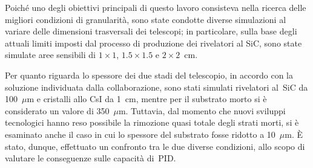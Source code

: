 Poiché uno degli obiettivi principali di questo lavoro consisteva nella ricerca delle migliori condizioni di granularità, sono state condotte diverse simulazioni al variare delle dimensioni trasversali dei telescopi; in particolare, sulla base degli attuali limiti imposti dal processo di produzione dei rivelatori al SiC, sono state simulate aree sensibili di $1 \times 1$, $1.5 \times 1.5$ e $2 \times 2$~cm.





Per quanto riguarda lo spessore dei due stadi del telescopio, in accordo con la soluzione individuata dalla collaborazione, sono stati simulati rivelatori al~SiC da 100~$\mu$m e cristalli allo CsI da 1~cm, mentre per il substrato morto si è considerato un valore di 350~$\mu$m.
Tuttavia, dal momento che nuovi sviluppi tecnologici hanno reso possibile la rimozione quasi totale degli strati morti, si è esaminato anche il caso in cui lo spessore del substrato fosse ridotto a 10~$\mu$m. 
È stato, dunque, effettuato un confronto tra le due diverse condizioni, allo scopo di valutare le conseguenze sulle capacità di~PID.





